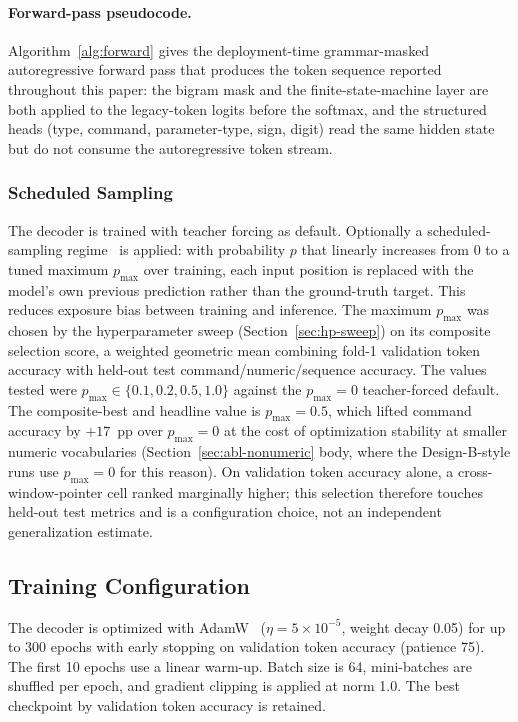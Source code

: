 \documentclass[sensors,article,submit,moreauthors,pdftex]{Definitions/mdpi}
\begin{document}
\paragraph{Forward-pass pseudocode.} Algorithm~\ref{alg:forward} gives the deployment-time grammar-masked autoregressive forward pass that produces the token sequence reported throughout this paper: the bigram mask and the finite-state-machine layer are both applied to the legacy-token logits before the softmax, and the structured heads (type, command, parameter-type, sign, digit) read the same hidden state but do not consume the autoregressive token stream.


\subsubsection{Scheduled Sampling}
\label{sec:scheduled-sampling}

The decoder is trained with teacher forcing as default. Optionally a scheduled-sampling regime~\cite{scheduled_sampling} is applied: with probability $p$ that linearly increases from $0$ to a tuned maximum $p_{\text{max}}$ over training, each input position is replaced with the model's own previous prediction rather than the ground-truth target. This reduces exposure bias between training and inference. The maximum $p_{\text{max}}$ was chosen by the hyperparameter sweep (Section~\ref{sec:hp-sweep}) on its composite selection score, a weighted geometric mean combining fold-1 validation token accuracy with held-out test command/numeric/sequence accuracy. The values tested were $p_{\text{max}} \in \{0.1, 0.2, 0.5, 1.0\}$ against the $p_{\text{max}}\!=\!0$ teacher-forced default. The composite-best and headline value is $p_{\text{max}}\!=\!0.5$, which lifted command accuracy by $+17$~pp over $p_{\text{max}}\!=\!0$ at the cost of optimization stability at smaller numeric vocabularies (Section~\ref{sec:abl-nonumeric} body, where the Design-B-style runs use $p_{\text{max}}\!=\!0$ for this reason). On validation token accuracy alone, a cross-window-pointer cell ranked marginally higher; this selection therefore touches held-out test metrics and is a configuration choice, not an independent generalization estimate.

\subsection{Training Configuration}
\label{sec:training}

The decoder is optimized with AdamW~\cite{loshchilov2019adamw} ($\eta = 5 \times 10^{-5}$, weight decay 0.05) for up to 300 epochs with early stopping on validation token accuracy (patience 75). The first 10 epochs use a linear warm-up. Batch size is 64, mini-batches are shuffled per epoch, and gradient clipping is applied at norm 1.0. The best checkpoint by validation token accuracy is retained.
\end{document}
